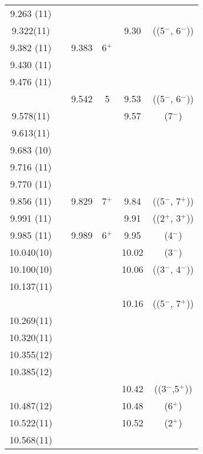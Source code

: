 \begin{center}
\begin{longtable}{cc cc cc}
  9.263 (11)    &   &   &   &   &                           \\
   9.322(11)    &   &   &   & 9.30  & ((5$^-$, 6$^-$))          \\
  9.382 (11)    &   & 9.383 & 6$^+$ &   &   \\
  9.430 (11)    &   &   &   &   &   \\
  9.476 (11)    &   &   &   &   &   \\
  &   & 9.542 & 5 & 9.53  & ((5$^-$, 6$^-$))        \\
   9.578(11)    &   &   &   & 9.57  & (7$^-$)                 \\
   9.613(11)    &   &   &   &   &                         \\
  9.683 (10)    &   &   &   &   &                         \\
  9.716 (11)    &   &   &   &   &                         \\
  9.770 (11)    &   &   &   &   &                         \\
  9.856 (11)    &   & 9.829 & 7$^+$ & 9.84  & ((5$^-$, 7$^+$))        \\
  9.991 (11)    &   &   &             & 9.91  & ((2$^+$, 3$^+$))        \\
  9.985 (11)    &   & 9.989 & 6$^+ $      & 9.95  & (4$^-$)                 \\
  10.040(10)    &   &   &   & 10.02 & (3$^-$)                 \\
  10.100(10)    &   &   &   & 10.06 & ((3$^-$, 4$^-$))        \\
  10.137(11)    &   &   &   &   &                         \\
  &   &   &   & 10.16 & ((5$^-$, 7$^+$))        \\
  10.269(11)    &   &   &   &   &                         \\
  10.320(11)    &   &   &   &   &                         \\
  10.355(12)    &   &   &   &   &                         \\
  10.385(12)    &   &   &   &   &                         \\
  &   &   &   & 10.42 & ((3$^-$,5$^+$))         \\
  10.487(12)    &   &   &   & 10.48 & (6$^+$)                 \\
  10.522(11)    &   &   &   & 10.52 & (2$^+$)                 \\
10.568(11)  &   &   &   &   &                         \\

\end{longtable}
\end{center}
